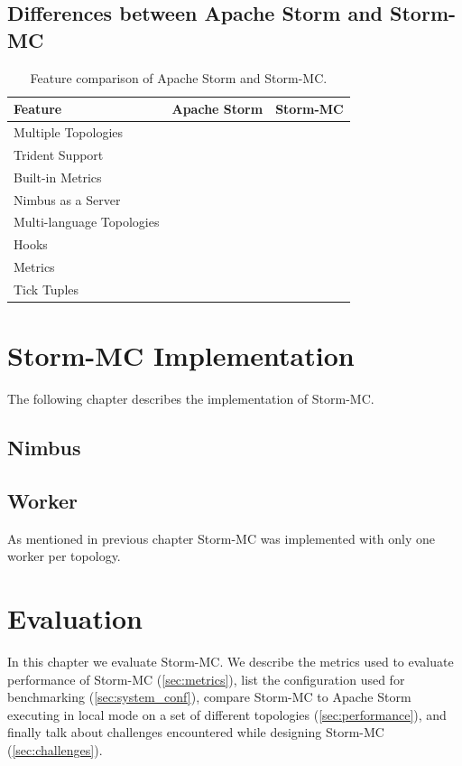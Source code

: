 \documentclass[bsc,logo,frontabs,twoside,singlespacing,normalheadings,parskip]{infthesis}\usepackage[]{graphicx}\usepackage[]{color}
\newcommand{\cmark}{\ding{51}}\newcommand{\xmark}{\ding{55}}
\begin{document}
\section{Differences between Apache Storm and Storm-MC}
\label{sec:differences}

\begin{table}[h!]
\centering
\begin{tabular}{@{}lcc@{}}
    \textbf{Feature} & \textbf{Apache Storm} & \textbf{Storm-MC} \\ \toprule
    Multiple Topologies & \cmark & \xmark \\
	Trident Support & \cmark & \xmark \\
    Built-in Metrics & \cmark & \xmark \\
    Nimbus as a Server & \cmark & \xmark \\
    Multi-language Topologies & \cmark & \cmark \\
    Hooks & \cmark & \cmark \\
    Metrics & \cmark & \cmark \\
    Tick Tuples & \cmark & \cmark \\
\end{tabular}
\caption{Feature comparison of Apache Storm and Storm-MC.}
\label{table:features}
\end{table}
\clearpage{}

\clearpage{}\chapter{Storm-MC Implementation}

The following chapter describes the implementation of Storm-MC.

\section{Nimbus}

\section{Worker}

As mentioned in previous chapter Storm-MC was implemented with only one worker per topology.\clearpage{}

\clearpage{}\chapter{Evaluation}

In this chapter we evaluate Storm-MC. We describe the metrics used to evaluate performance of Storm-MC (\ref{sec:metrics}), list the configuration used for benchmarking (\ref{sec:system_conf}), compare Storm-MC to Apache Storm executing in local mode on a set of different topologies (\ref{sec:performance}), and finally talk about challenges encountered while designing Storm-MC (\ref{sec:challenges}).
\end{document}
